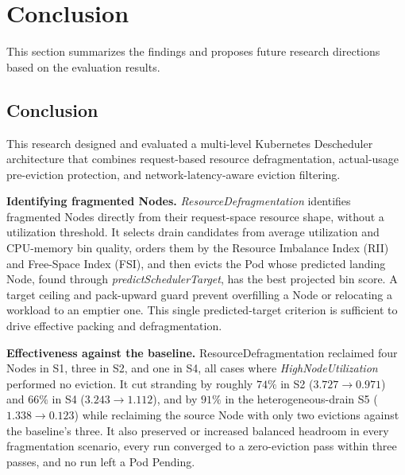 \section{Conclusion}
\label{bab:5}

This section summarizes the findings and proposes future research directions based on the evaluation results.

\subsection{Conclusion}
\label{sec:conclusion}

This research designed and evaluated a multi-level Kubernetes Descheduler architecture that combines request-based resource defragmentation, actual-usage pre-eviction protection, and network-latency-aware eviction filtering.

\textbf{Identifying fragmented Nodes.} \textit{ResourceDefragmentation} identifies fragmented Nodes directly from their request-space resource shape, without a utilization threshold. It selects drain candidates from average utilization and CPU-memory bin quality, orders them by the Resource Imbalance Index (RII) and Free-Space Index (FSI), and then evicts the Pod whose predicted landing Node, found through \textit{predictSchedulerTarget}, has the best projected bin score. A target ceiling and pack-upward guard prevent overfilling a Node or relocating a workload to an emptier one. This single predicted-target criterion is sufficient to drive effective packing and defragmentation.

\textbf{Effectiveness against the baseline.} ResourceDefragmentation reclaimed four Nodes in S1, three in S2, and one in S4, all cases where \textit{HighNodeUtilization} performed no eviction. It cut stranding by roughly \(74\%\) in S2 (\(3.727 \to 0.971\)) and \(66\%\) in S4 (\(3.243 \to 1.112\)), and by \(91\%\) in the heterogeneous-drain S5 (\(1.338 \to 0.123\)) while reclaiming the source Node with only two evictions against the baseline's three. It also preserved or increased balanced headroom in every fragmentation scenario, every run converged to a zero-eviction pass within three passes, and no run left a Pod Pending.

